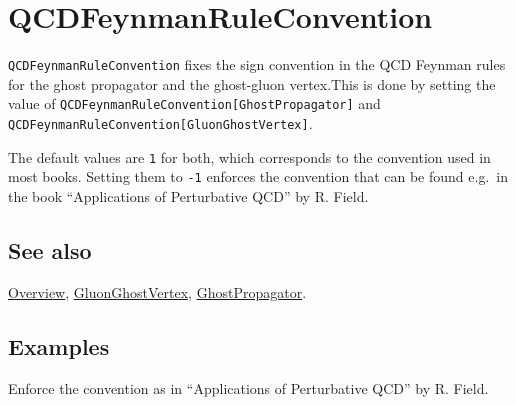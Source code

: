 \documentclass[../FeynCalcManual.tex]{subfiles}
\begin{document}
\hypertarget{qcdfeynmanruleconvention}{
\section{QCDFeynmanRuleConvention}\label{qcdfeynmanruleconvention}}

\texttt{QCDFeynmanRuleConvention} fixes the sign convention in the QCD
Feynman rules for the ghost propagator and the ghost-gluon vertex.This
is done by setting the value of
\texttt{QCDFeynmanRuleConvention[\allowbreak{}GhostPropagator]} and
\texttt{QCDFeynmanRuleConvention[\allowbreak{}GluonGhostVertex]}.

The default values are \texttt{1} for both, which corresponds to the
convention used in most books. Setting them to \texttt{-1} enforces the
convention that can be found e.g.~in the book ``Applications of
Perturbative QCD'' by R. Field.

\subsection{See also}

\hyperlink{toc}{Overview},
\hyperlink{gluonghostvertex}{GluonGhostVertex},
\hyperlink{ghostpropagator}{GhostPropagator}.

\subsection{Examples}

Enforce the convention as in ``Applications of Perturbative QCD'' by R.
Field.

\begin{Shaded}
\begin{Highlighting}[]
\OperatorTok{[}\OperatorTok{]} \ExtensionTok{=} \SpecialCharTok{{-}}\NormalTok{; }
 
\OperatorTok{[}\OperatorTok{]} \ExtensionTok{=} \SpecialCharTok{{-}}\NormalTok{;}
\end{Highlighting}
\end{Shaded}

\begin{Shaded}
\begin{Highlighting}[]
\OperatorTok{[}\OperatorTok{,} \OperatorTok{,} \OperatorTok{]} \SpecialCharTok{//}
\end{Highlighting}
\end{Shaded}
\end{document}
